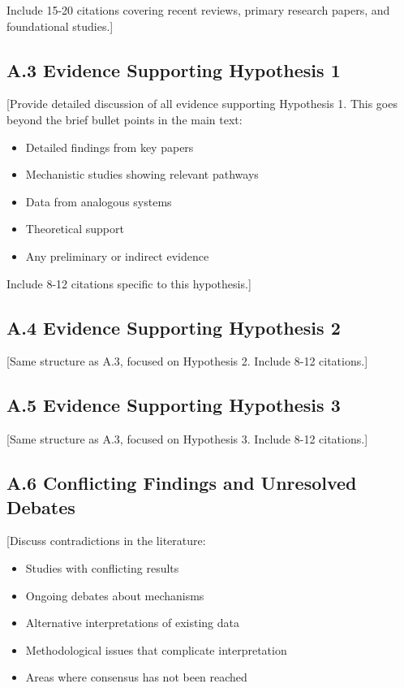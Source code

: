\documentclass[11pt,letterpaper]{article}
\begin{document}
Include 15-20 citations covering recent reviews, primary research papers, and foundational studies.]

\subsection*{A.3 Evidence Supporting Hypothesis 1}

[Provide detailed discussion of all evidence supporting Hypothesis 1. This goes beyond the brief bullet points in the main text:
\begin{itemize}
  \item Detailed findings from key papers
  \item Mechanistic studies showing relevant pathways
  \item Data from analogous systems
  \item Theoretical support
  \item Any preliminary or indirect evidence
\end{itemize}

Include 8-12 citations specific to this hypothesis.]

\subsection*{A.4 Evidence Supporting Hypothesis 2}

[Same structure as A.3, focused on Hypothesis 2. Include 8-12 citations.]

\subsection*{A.5 Evidence Supporting Hypothesis 3}

[Same structure as A.3, focused on Hypothesis 3. Include 8-12 citations.]


\subsection*{A.6 Conflicting Findings and Unresolved Debates}

[Discuss contradictions in the literature:
\begin{itemize}
  \item Studies with conflicting results
  \item Ongoing debates about mechanisms
  \item Alternative interpretations of existing data
  \item Methodological issues that complicate interpretation
  \item Areas where consensus has not been reached
\end{itemize}
\end{document}
